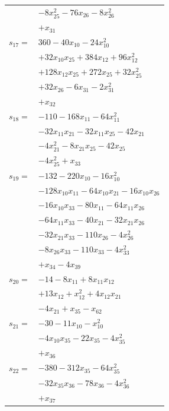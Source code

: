\begin{longtable}{@{}r@{\;}l@{}}
 & \(\displaystyle -8x_{25}^{2} -76x_{26} -8x_{26}^{2}\) \\
 & \(\displaystyle +x_{31}\) \\[3pt]
\(s_{17}=\) & \(\displaystyle 360 -40x_{10} -24x_{10}^{2}\) \\
 & \(\displaystyle +32x_{10}x_{25} +384x_{12} +96x_{12}^{2}\) \\
 & \(\displaystyle +128x_{12}x_{25} +272x_{25} +32x_{25}^{2}\) \\
 & \(\displaystyle +32x_{26} -6x_{31} -2x_{31}^{2}\) \\
 & \(\displaystyle +x_{32}\) \\[3pt]
\(s_{18}=\) & \(\displaystyle -110 -168x_{11} -64x_{11}^{2}\) \\
 & \(\displaystyle -32x_{11}x_{21} -32x_{11}x_{25} -42x_{21}\) \\
 & \(\displaystyle -4x_{21}^{2} -8x_{21}x_{25} -42x_{25}\) \\
 & \(\displaystyle -4x_{25}^{2} +x_{33}\) \\[3pt]
\(s_{19}=\) & \(\displaystyle -132 -220x_{10} -16x_{10}^{2}\) \\
 & \(\displaystyle -128x_{10}x_{11} -64x_{10}x_{21} -16x_{10}x_{26}\) \\
 & \(\displaystyle -16x_{10}x_{33} -80x_{11} -64x_{11}x_{26}\) \\
 & \(\displaystyle -64x_{11}x_{33} -40x_{21} -32x_{21}x_{26}\) \\
 & \(\displaystyle -32x_{21}x_{33} -110x_{26} -4x_{26}^{2}\) \\
 & \(\displaystyle -8x_{26}x_{33} -110x_{33} -4x_{33}^{2}\) \\
 & \(\displaystyle +x_{34} -4x_{39}\) \\[3pt]
\(s_{20}=\) & \(\displaystyle -14 -8x_{11} +8x_{11}x_{12}\) \\
 & \(\displaystyle +13x_{12} +x_{12}^{2} +4x_{12}x_{21}\) \\
 & \(\displaystyle -4x_{21} +x_{35} -x_{62}\) \\[3pt]
\(s_{21}=\) & \(\displaystyle -30 -11x_{10} -x_{10}^{2}\) \\
 & \(\displaystyle -4x_{10}x_{35} -22x_{35} -4x_{35}^{2}\) \\
 & \(\displaystyle +x_{36}\) \\[3pt]
\(s_{22}=\) & \(\displaystyle -380 -312x_{35} -64x_{35}^{2}\) \\
 & \(\displaystyle -32x_{35}x_{36} -78x_{36} -4x_{36}^{2}\) \\
 & \(\displaystyle +x_{37}\) \\[3pt]

\end{longtable}
